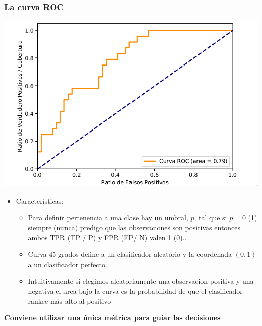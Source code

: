 \documentclass[leqno, 10pt, envcountsect]{beamer}
\numberwithin{equation}{section}
\theoremstyle{definition}
\theoremstyle{example}
\numberwithin{figure}{section}
\numberwithin{table}{section}
\let\olditem\item
\renewcommand{\item}{%
\olditem\vspace{1pt}}
\begin{document}
\begin{frame}[fragile=singleslide]
  \frametitle{La curva ROC}
  \begin{center}
    \includegraphics[scale=0.2]{roc.png}
  \end{center}
  \begin{itemize}
    \item Características:
      \begin{itemize}
        \item Para definir pertenencia a una clase hay un umbral, $p$, tal que
          si $p=0$ (1) siempre (nunca) predigo que las observaciones son
          positivas entonces ambos TPR (TP / P) y FPR (FP/ N) valen 1 (0)..
        \item Curva 45 grados define a un clasificador aleatorio y la
          coordenada $(0,1)$ a un clasificador perfecto
        \item Intuitivamente si elegimos aleatoriamente una observacion
          positiva y una negativa el area bajo la curva es la probabilidad de
          que el clasificador rankee más alto al positivo
      \end{itemize}
  \end{itemize}

  \textbf{Conviene utilizar una única métrica para guiar las decisiones}
\end{frame}
\end{document}

